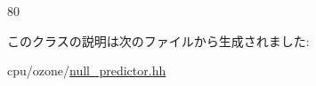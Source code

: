 \begin{DoxyCode}
80 { }
\end{DoxyCode}


このクラスの説明は次のファイルから生成されました:\begin{DoxyCompactItemize}
\item 
cpu/ozone/\hyperlink{null__predictor_8hh}{null\_\-predictor.hh}\end{DoxyCompactItemize}
